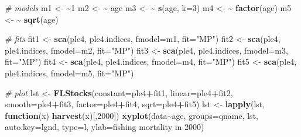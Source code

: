 \documentclass[
]{book}
\newenvironment{Shaded}{\begin{snugshade}}{\end{snugshade}}
\newcommand{\AttributeTok}[1]{\textcolor[rgb]{0.13,0.29,0.53}{#1}}
\newcommand{\CommentTok}[1]{\textcolor[rgb]{0.56,0.35,0.01}{\textit{#1}}}
\newcommand{\ControlFlowTok}[1]{\textcolor[rgb]{0.13,0.29,0.53}{\textbf{#1}}}
\newcommand{\DecValTok}[1]{\textcolor[rgb]{0.00,0.00,0.81}{#1}}
\newcommand{\ErrorTok}[1]{\textcolor[rgb]{0.64,0.00,0.00}{\textbf{#1}}}
\newcommand{\FunctionTok}[1]{\textcolor[rgb]{0.13,0.29,0.53}{\textbf{#1}}}
\newcommand{\NormalTok}[1]{#1}
\newcommand{\OtherTok}[1]{\textcolor[rgb]{0.56,0.35,0.01}{#1}}
\newcommand{\SpecialCharTok}[1]{\textcolor[rgb]{0.81,0.36,0.00}{\textbf{#1}}}
\newcommand{\StringTok}[1]{\textcolor[rgb]{0.31,0.60,0.02}{#1}}
\begin{document}
\begin{Shaded}
\begin{Highlighting}[]
\CommentTok{\# models}
\NormalTok{m1 }\OtherTok{\textless{}{-}} \ErrorTok{\textasciitilde{}}\DecValTok{1}
\NormalTok{m2 }\OtherTok{\textless{}{-}} \ErrorTok{\textasciitilde{}}\NormalTok{ age}
\NormalTok{m3 }\OtherTok{\textless{}{-}} \ErrorTok{\textasciitilde{}} \FunctionTok{s}\NormalTok{(age, }\AttributeTok{k=}\DecValTok{3}\NormalTok{)}
\NormalTok{m4 }\OtherTok{\textless{}{-}} \ErrorTok{\textasciitilde{}} \FunctionTok{factor}\NormalTok{(age)}
\NormalTok{m5 }\OtherTok{\textless{}{-}} \ErrorTok{\textasciitilde{}} \FunctionTok{sqrt}\NormalTok{(age)}

\CommentTok{\# fits}
\NormalTok{fit1 }\OtherTok{\textless{}{-}} \FunctionTok{sca}\NormalTok{(ple4, ple4.indices, }\AttributeTok{fmodel=}\NormalTok{m1, }\AttributeTok{fit=}\StringTok{"MP"}\NormalTok{)}
\NormalTok{fit2 }\OtherTok{\textless{}{-}} \FunctionTok{sca}\NormalTok{(ple4, ple4.indices, }\AttributeTok{fmodel=}\NormalTok{m2, }\AttributeTok{fit=}\StringTok{"MP"}\NormalTok{)}
\NormalTok{fit3 }\OtherTok{\textless{}{-}} \FunctionTok{sca}\NormalTok{(ple4, ple4.indices, }\AttributeTok{fmodel=}\NormalTok{m3, }\AttributeTok{fit=}\StringTok{"MP"}\NormalTok{)}
\NormalTok{fit4 }\OtherTok{\textless{}{-}} \FunctionTok{sca}\NormalTok{(ple4, ple4.indices, }\AttributeTok{fmodel=}\NormalTok{m4, }\AttributeTok{fit=}\StringTok{"MP"}\NormalTok{)}
\NormalTok{fit5 }\OtherTok{\textless{}{-}} \FunctionTok{sca}\NormalTok{(ple4, ple4.indices, }\AttributeTok{fmodel=}\NormalTok{m5, }\AttributeTok{fit=}\StringTok{"MP"}\NormalTok{)}

\CommentTok{\# plot}
\NormalTok{lst }\OtherTok{\textless{}{-}} \FunctionTok{FLStocks}\NormalTok{(}\AttributeTok{constant=}\NormalTok{ple4}\SpecialCharTok{+}\NormalTok{fit1,}
  \AttributeTok{linear=}\NormalTok{ple4}\SpecialCharTok{+}\NormalTok{fit2,}
  \AttributeTok{smooth=}\NormalTok{ple4}\SpecialCharTok{+}\NormalTok{fit3,}
  \AttributeTok{factor=}\NormalTok{ple4}\SpecialCharTok{+}\NormalTok{fit4,}
  \AttributeTok{sqrt=}\NormalTok{ple4}\SpecialCharTok{+}\NormalTok{fit5)}
\NormalTok{lst }\OtherTok{\textless{}{-}} \FunctionTok{lapply}\NormalTok{(lst, }\ControlFlowTok{function}\NormalTok{(x) }\FunctionTok{harvest}\NormalTok{(x)[,}\StringTok{\textquotesingle{}2000\textquotesingle{}}\NormalTok{])}
\FunctionTok{xyplot}\NormalTok{(data}\SpecialCharTok{\textasciitilde{}}\NormalTok{age, }\AttributeTok{groups=}\NormalTok{qname, lst, }\AttributeTok{auto.key=}\NormalTok{lgnd, }\AttributeTok{type=}\StringTok{\textquotesingle{}l\textquotesingle{}}\NormalTok{, }\AttributeTok{ylab=}\StringTok{\textquotesingle{}fishing mortality in 2000\textquotesingle{}}\NormalTok{)}
\end{Highlighting}
\end{Shaded}
\end{document}
